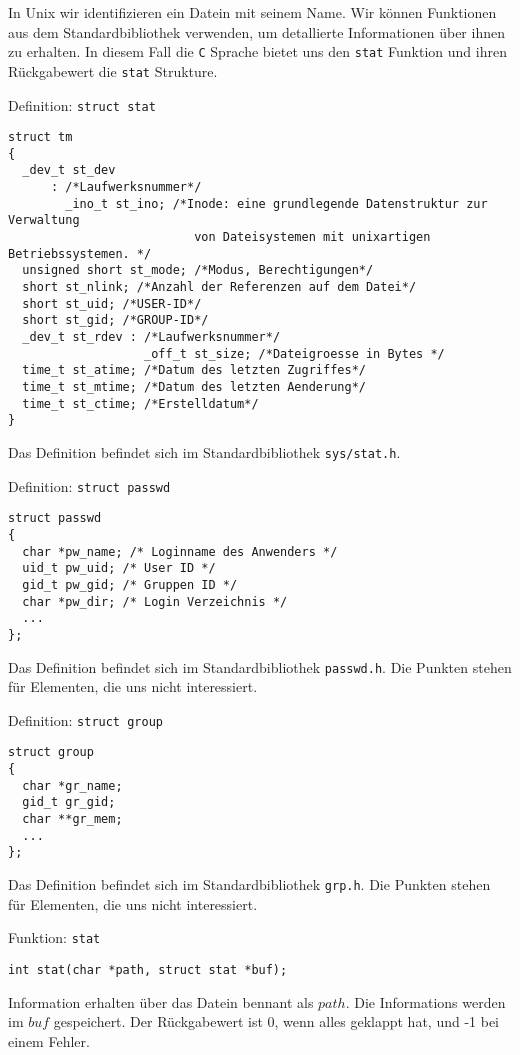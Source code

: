 In Unix wir identifizieren ein Datein mit seinem Name. Wir können Funktionen aus dem Standardbibliothek verwenden, um
detallierte Informationen über ihnen zu erhalten. In diesem Fall die \texttt{C} Sprache bietet uns den \texttt{stat} Funktion 
und ihren Rückgabewert die \texttt{stat} Strukture. 
\begin{myexampleblock}{Definition: \texttt{struct stat}}
\begin{lstlisting}
struct tm
{
  _dev_t st_dev
      : /*Laufwerksnummer*/
        _ino_t st_ino; /*Inode: eine grundlegende Datenstruktur zur Verwaltung
                          von Dateisystemen mit unixartigen Betriebssystemen. */
  unsigned short st_mode; /*Modus, Berechtigungen*/
  short st_nlink; /*Anzahl der Referenzen auf dem Datei*/
  short st_uid; /*USER-ID*/
  short st_gid; /*GROUP-ID*/
  _dev_t st_rdev : /*Laufwerksnummer*/
                   _off_t st_size; /*Dateigroesse in Bytes */
  time_t st_atime; /*Datum des letzten Zugriffes*/
  time_t st_mtime; /*Datum des letzten Aenderung*/
  time_t st_ctime; /*Erstelldatum*/
}
\end{lstlisting}
\vspace{-0.4cm}
Das Definition befindet sich im Standardbibliothek \texttt{sys/stat.h}.
\end{myexampleblock}
\begin{myexampleblock}{Definition: \texttt{struct passwd}}
\begin{lstlisting}
struct passwd
{
  char *pw_name; /* Loginname des Anwenders */
  uid_t pw_uid; /* User ID */
  gid_t pw_gid; /* Gruppen ID */
  char *pw_dir; /* Login Verzeichnis */
  ...
};
\end{lstlisting}
\vspace{-0.4cm}
Das Definition befindet sich im Standardbibliothek \texttt{passwd.h}.
Die Punkten stehen für Elementen, die uns nicht interessiert.
\end{myexampleblock}
\begin{myexampleblock}{Definition: \texttt{struct group}}
\begin{lstlisting}
struct group
{
  char *gr_name;
  gid_t gr_gid;
  char **gr_mem;
  ...
};
\end{lstlisting}
\vspace{-0.4cm}
Das Definition befindet sich im Standardbibliothek \texttt{grp.h}.
Die Punkten stehen für Elementen, die uns nicht interessiert.
\end{myexampleblock}
\begin{myexampleblock}{Funktion: \texttt{stat}}
\begin{lstlisting}
int stat(char *path, struct stat *buf);
\end{lstlisting}
\vspace{-.4cm}
Information erhalten über das Datein bennant als $path$. Die Informations werden im $buf$ gespeichert.
Der Rückgabewert ist 0, wenn alles geklappt hat, und -1 bei einem Fehler.
\end{myexampleblock}
